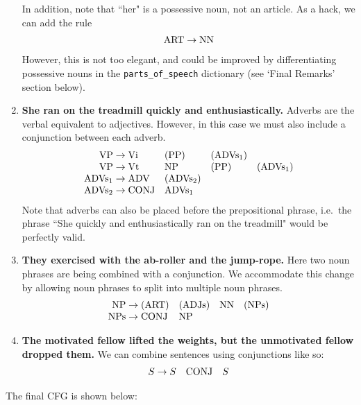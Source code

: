 \documentclass{article}
\newcommand{\CONJ}{\text{CONJ}}
\newcommand{\ART}{\text{ART}}
\newcommand{\NPs}{\text{NPs}}
\newcommand{\NP}{\text{NP}}
\newcommand{\NN}{\text{NN}}
\newcommand{\VP}{\text{VP}}
\newcommand{\Vi}{\text{Vi}}
\newcommand{\Vt}{\text{Vt}}
\newcommand{\ADVs}{\text{ADVs}}
\newcommand{\ADV}{\text{ADV}}
\newcommand{\ADJs}{\text{ADJs}}
\newcommand{\PP}{\text{PP}}
\begin{document}
\begin{enumerate}[label = \textbf{\arabic*.}]
    \vspace{2mm} In addition, note that ``her" is a possessive noun, not an article. As a hack, we can add the rule
    $$\begin{array}{r@{ {}\rightarrow{} }lll}
        \ART & \NN
    \end{array}$$
    However, this is not too elegant, and could be improved by differentiating possessive nouns in the \lstinline{parts_of_speech} dictionary (see `Final Remarks' section below).
    \item \textbf{She ran on the treadmill quickly and enthusiastically.} Adverbs are the verbal equivalent to adjectives. However, in this case we must also include a conjunction between each adverb.
    $$\begin{array}{r@{ {}\rightarrow{} }llll}
        \VP & \Vi & (\PP) & (\ADVs_{1}) \\
        \VP & \Vt & \NP & (\PP) & (\ADVs_{1}) \\
        \ADVs_{1} & \ADV & (\ADVs_{2}) \\
        \ADVs_{2} & \CONJ & \ADVs_{1}
    \end{array}$$
    Note that adverbs can also be placed before the prepositional phrase, i.e.\ the phrase ``She quickly and enthusiastically ran on the treadmill" would be perfectly valid.
    \item \textbf{They exercised with the ab-roller and the jump-rope.} Here two noun phrases are being combined with a conjunction. We accommodate this change by allowing noun phrases to split into multiple noun phrases.
    $$\begin{array}{r@{ {}\rightarrow{} }llll}
        \NP & (\ART) & (\ADJs) & \NN & (\NPs) \\
        \NPs & \CONJ & \NP
    \end{array}$$
    \item \textbf{The motivated fellow lifted the weights, but the unmotivated fellow dropped them.} We can combine sentences using conjunctions like so:
    $$\begin{array}{r@{ {}\rightarrow{} }lll}
        S & S & \CONJ & S
    \end{array}$$
\end{enumerate}
    The final CFG is shown below:
\end{document}
